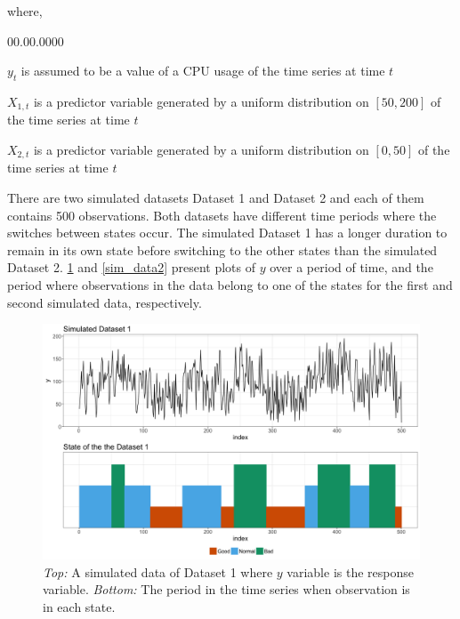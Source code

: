 where, 
\begin{labeling}{00.00.0000}
\item [{$y_{t}$}] is assumed to be a value of a CPU usage of the time
series at time $t$
\item [{$X_{1,t}$}] is a predictor variable generated by a uniform distribution
on $[50,200]$ of the time series at time $t$
\item [{$X_{2,t}$}] is a predictor variable generated by a uniform distribution
on $[0,50]$ of the time series at time $t$
\end{labeling}
There are two simulated datasets \textendash{} Dataset 1 and Dataset
2 \textendash{} and each of them contains 500 observations. Both datasets
have different time periods where the switches between states occur.
The simulated Dataset 1 has a longer duration to remain in its own
state before switching to the other states than the simulated Dataset
2. \ref{sim_data} and \ref{sim_data2} present plots of $y$ over
a period of time, and the period where observations in the data belong
to one of the states for the first and second simulated data, respectively.

\begin{figure}[H]
\begin{centering}
\includegraphics[scale=0.35]{picture/sim1}
\par\end{centering}
\caption{\emph{Top:} A simulated data of Dataset 1 where $y$ variable is the
response variable. \emph{Bottom:} The period in the time series when
observation is in each state.}
\label{sim_data}
\end{figure}

